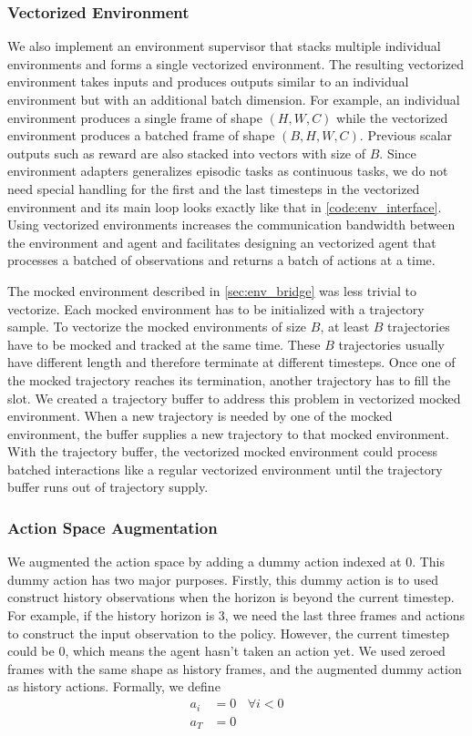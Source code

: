 \documentclass[12pt]{article}
\begin{document}
\subsubsection{Vectorized Environment} \label{sec:vec_env}
We also implement an environment supervisor that stacks multiple individual environments and forms a single vectorized environment.
The resulting vectorized environment takes inputs and produces outputs similar to an individual environment but with an additional batch dimension.
For example, an individual environment produces a single frame of shape $(H, W, C)$ while the vectorized environment produces a batched frame of shape $(B, H, W, C)$.
Previous scalar outputs such as reward are also stacked into vectors with size of $B$.
Since environment adapters generalizes episodic tasks as continuous tasks, we do not need special handling for the first and the last timesteps in the vectorized environment and its main loop looks exactly like that in \ref{code:env_interface}.
Using vectorized environments increases the communication bandwidth between the environment and agent and facilitates designing an vectorized agent that processes a batched of observations and returns a batch of actions at a time.

The mocked environment described in \ref{sec:env_bridge} was less trivial to vectorize.
Each mocked environment has to be initialized with a trajectory sample.
To vectorize the mocked environments of size $B$, at least $B$ trajectories have to be mocked and tracked at the same time.
These $B$ trajectories usually have different length and therefore terminate at different timesteps.
Once one of the mocked trajectory reaches its termination, another trajectory has to fill the slot.
We created a trajectory buffer to address this problem in vectorized mocked environment.
When a new trajectory is needed by one of the mocked environment, the buffer supplies a new trajectory to that mocked environment.
With the trajectory buffer, the vectorized mocked environment could process batched interactions like a regular vectorized environment until the trajectory buffer runs out of trajectory supply.

\subsubsection{Action Space Augmentation} \label{sec:a_aug}
We augmented the action space by adding a dummy action indexed at 0.
This dummy action has two major purposes.
Firstly, this dummy action is to used construct history observations when the horizon is beyond the current timestep.
For example, if the history horizon is 3, we need the last three frames and actions to construct the input observation to the policy.
However, the current timestep could be 0, which means the agent hasn't taken an action yet.
We used zeroed frames with the same shape as history frames, and the augmented dummy action as history actions.
Formally, we define
\begin{align*}
    a_{i}  & = 0 ~~~~ \forall i < 0  \\
    a_{T}  & = 0  \\
\end{align*}
\end{document}

